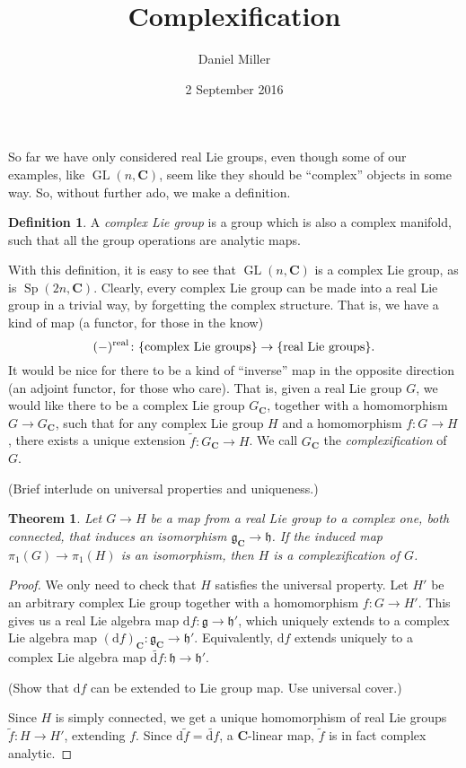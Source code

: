\documentclass{article}
\title{Complexification}
\author{Daniel Miller}
\date{2 September 2016}
\DeclareMathOperator{\GL}{GL}
\DeclareMathOperator{\Sp}{Sp}
\newcommand{\bC}{{\mathbf C}}
\newcommand{\fg}{{\mathfrak g}}
\newcommand{\fh}{{\mathfrak h}}
\newcommand{\dd}{\mathrm{d}}
\newcommand{\real}{\mathrm{real}}
\newtheorem{theorem}{Theorem}
\theoremstyle{definition}
\newtheorem{definition}{Definition}
\begin{document}
\maketitle





So far we have only considered real Lie groups, even though some of our 
examples, like $\GL(n,\bC)$, seem like they should be ``complex'' objects in 
some way. So, without further ado, we make a definition. 

\begin{definition}
A \emph{complex Lie group} is a group which is also a complex manifold, such 
that all the group operations are analytic maps.  
\end{definition}

With this definition, it is easy to see that $\GL(n,\bC)$ is a complex Lie 
group, as is $\Sp(2n,\bC)$. Clearly, every complex Lie group can be made into 
a real Lie group in a trivial way, by forgetting the complex structure. That 
is, we have a kind of map (a functor, for those in the know)
\[
	(-)^\real \colon \{\textnormal{complex Lie groups}\} \to \{\textnormal{real Lie groups}\} .
\]
It would be nice for there to be a kind of ``inverse'' map in the opposite 
direction (an adjoint functor, for those who care). That is, given a real Lie 
group $G$, we would like there to be a complex Lie group $G_\bC$, together 
with a homomorphism $G\to G_\bC$, such that for any complex Lie group $H$ and 
a homomorphism $f\colon G\to H$, there exists a unique extension 
$\widetilde f\colon G_\bC \to H$. We call $G_\bC$ the \emph{complexification} 
of $G$. 

(Brief interlude on universal properties and uniqueness.)

\begin{theorem}
Let $G\to H$ be a map from a real Lie group to a complex one, both connected, 
that induces an isomorphism $\fg_\bC \to \fh$. If the induced map 
$\pi_1(G) \to \pi_1(H)$ is an isomorphism, then $H$ is a complexification of 
$G$. 
\end{theorem}
\begin{proof}
We only need to check that $H$ satisfies the universal property. Let 
$H'$ be an arbitrary complex Lie group together with a homomorphism 
$f\colon G\to H'$. This gives us a real Lie algebra map 
$\dd f\colon \fg \to \fh'$, which uniquely extends to a complex Lie algebra 
map $(\dd f)_\bC\colon \fg_\bC\to \fh'$. Equivalently, $\dd f$ extends uniquely 
to a complex Lie algebra map $\widetilde{\dd f}\colon \fh\to \fh'$. 

(Show that $\dd f$ can be extended to Lie group map. Use universal cover.)

Since 
$H$ is simply connected, we get a unique homomorphism of real Lie groups 
$\widetilde f\colon H\to H'$, extending $f$. Since 
$\dd \widetilde f = \widetilde{\dd f}$, a $\bC$-linear map, $\widetilde f$ is 
in fact complex analytic. 
\end{proof}
\end{document}
